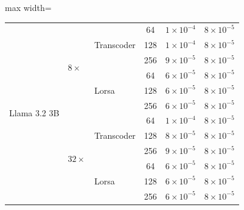 \documentclass{article}
\begin{document}
\begin{table}[t]
\begin{adjustbox}{max width=\textwidth}
\begin{tabular}{lllccc}
        \multirow{12}{*}{Llama 3.2 3B}
        & \multirow{6}{*}{$8\times$}
        & \multirow{3}{*}{Transcoder}
        & 64  & $1{\times}10^{-4}$ & $8{\times}10^{-5}$ \\
        & & & 128 & $1{\times}10^{-4}$ & $8{\times}10^{-5}$ \\
        & & & 256 & $9{\times}10^{-5}$ & $8{\times}10^{-5}$ \\
        \cmidrule(lr){3-6}
        & & \multirow{3}{*}{Lorsa}
        & 64  & $6{\times}10^{-5}$ & $8{\times}10^{-5}$ \\
        & & & 128 & $6{\times}10^{-5}$ & $8{\times}10^{-5}$ \\
        & & & 256 & $6{\times}10^{-5}$ & $8{\times}10^{-5}$ \\
        \cmidrule(lr){2-6}
        & \multirow{6}{*}{$32\times$}
        & \multirow{3}{*}{Transcoder}
        & 64  & $1{\times}10^{-4}$ & $8{\times}10^{-5}$ \\
        & & & 128 & $8{\times}10^{-5}$ & $8{\times}10^{-5}$ \\
        & & & 256 & $9{\times}10^{-5}$ & $8{\times}10^{-5}$ \\
        \cmidrule(lr){3-6}
        & & \multirow{3}{*}{Lorsa}
        & 64  & $6{\times}10^{-5}$ & $8{\times}10^{-5}$ \\
        & & & 128 & $6{\times}10^{-5}$ & $8{\times}10^{-5}$ \\
        & & & 256 & $6{\times}10^{-5}$ & $8{\times}10^{-5}$ \\

        \bottomrule
    \end{tabular}
    \end{adjustbox}
\end{table}
\end{document}
